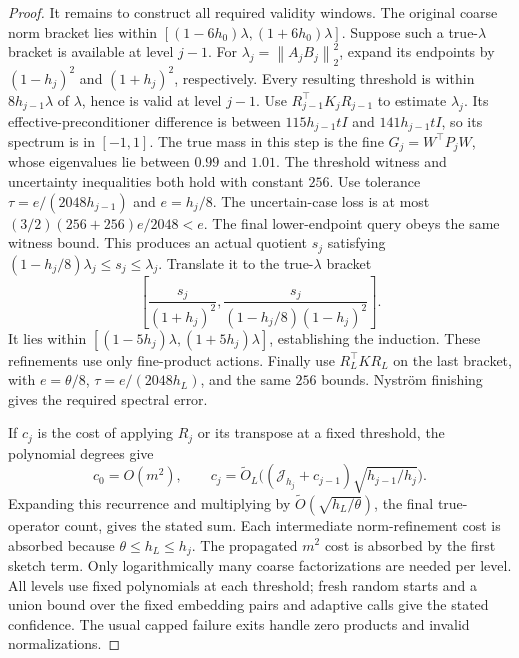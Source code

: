 \documentclass[11pt]{article}
\newcommand{\norm}[1]{\left\lVert#1\right\rVert}
\newcommand{\tO}{\widetilde O}
\begin{document}
\begin{proof}
It remains to construct all required validity windows. The original
coarse norm bracket lies within
\([(1-6h_0)\lambda,(1+6h_0)\lambda]\).
Suppose such a true-\(\lambda\) bracket is available at level \(j-1\).
For \(\lambda_j=\norm{A_jB_j}_2^2\), expand its endpoints by
\((1-h_j)^2\) and \((1+h_j)^2\), respectively.
Every resulting threshold is within \(8h_{j-1}\lambda\) of
\(\lambda\), hence is valid at level \(j-1\).
Use \(R_{j-1}^\top K_jR_{j-1}\) to estimate \(\lambda_j\).
Its effective-preconditioner difference is between
\(115h_{j-1}tI\) and \(141h_{j-1}tI\), so its spectrum is in
\([-1,1]\). The true mass in this step is the fine
\(G_j=W^\top P_jW\), whose eigenvalues lie between \(0.99\) and \(1.01\).
The threshold witness and uncertainty inequalities both hold with
constant \(256\). Use tolerance
\(\tau=e/(2048h_{j-1})\) and \(e=h_j/8\).
The uncertain-case loss is at most
\((3/2)(256+256)e/2048<e\).
The final lower-endpoint query obeys the same witness bound.
This produces an actual quotient \(s_j\) satisfying
\((1-h_j/8)\lambda_j\leq s_j\leq\lambda_j\).
Translate it to the true-\(\lambda\) bracket
\[
 \left[\frac{s_j}{(1+h_j)^2},
       \frac{s_j}{(1-h_j/8)(1-h_j)^2}\right].
\]
It lies within \([(1-5h_j)\lambda,(1+5h_j)\lambda]\), establishing
the induction. These refinements use only fine-product actions.
Finally use \(R_L^\top K R_L\) on the last bracket, with
\(e=\theta/8\), \(\tau=e/(2048h_L)\), and the same \(256\) bounds.
Nystr\"om finishing gives the required spectral error.

If \(c_j\) is the cost of applying \(R_j\) or its transpose at a
fixed threshold, the polynomial degrees give
\[
 c_0=O(m^2),\qquad
 c_j=\tO_L\bigl((\mathcal J_{h_j}+c_{j-1})
                                     \sqrt{h_{j-1}/h_j}\bigr).
\]
Expanding this recurrence and multiplying by
\(\widetilde O(\sqrt{h_L/\theta})\), the final true-operator count,
gives the stated sum. Each intermediate norm-refinement cost is
absorbed because \(\theta\leq h_L\leq h_j\).
The propagated \(m^2\) cost is absorbed by the first sketch term.
Only logarithmically many coarse factorizations are needed per level.
All levels use fixed polynomials at each threshold; fresh random
starts and a union bound over the fixed embedding pairs and adaptive
calls give the stated confidence. The usual capped failure exits
handle zero products and invalid normalizations.
\end{proof}
\end{document}
